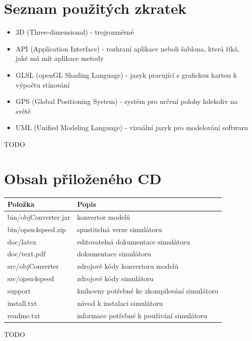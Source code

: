 \documentclass[11pt,twoside,a4paper]{book}
\begin{document}
\appendix

\chapter{Seznam použitých zkratek}
\begin{itemize}
\item 3D (Three-dimensional) - trojrozměrné
\item API (Application Interface) - rozhraní aplikace neboli šablona, která říká, jaké má mít aplikace metody
\item GLSL (openGL Shading Language) - jazyk pracující s grafickou kartou k výpočtu stínování
\item GPS (Global Positioning System) - systém pro určení polohy kdekoliv na světě
\item UML (Unified Modeling Language) - vizuální jazyk pro modelování softwaru
\end{itemize}
TODO

\chapter{Obsah přiloženého CD}

\begin{center}
\begin{tabular}{|p{50mm}|p{100mm}|}
\hline
\textbf{Položka} & 
\textbf{Popis} \\
\hline
\hline
bin/objConverter.jar & konvertor modelů\\
\hline
bin/open4speed.zip & spustitelná verze simulátoru\\
\hline
doc/latex & editovatelná dokumentace simulátoru\\
\hline
doc/text.pdf & dokumentace simulátoru\\
\hline
src/objConverter & zdrojové kódy konvertoru modelů\\
\hline
src/open4speed & zdrojové kódy simulátoru\\
\hline
support & knihovny potřebné ke zkompilování simulátoru\\
\hline
install.txt & návod k instalaci simulátoru\\
\hline
readme.txt & informace potřebné k používání simulátoru\\
\hline
\end{tabular}
\end{center}
TODO
\end{document}
